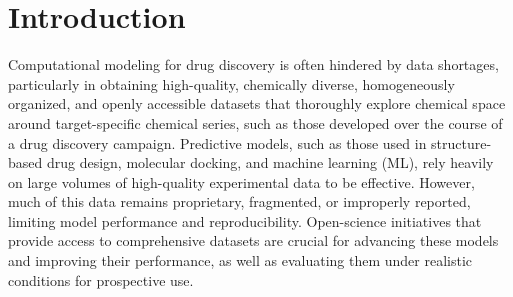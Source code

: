 \documentclass[journal=jcim,manuscript=article]{achemso}
\begin{document}
\section{Introduction}
Computational modeling for drug discovery is often hindered by data shortages, particularly in obtaining high-quality, chemically diverse, homogeneously organized, and openly accessible datasets that 
thoroughly explore chemical space around target-specific chemical series, such as those developed over the course of a drug discovery campaign\cite{van_tilborg_deep_2024, volkamer_machine_2023}.  Predictive models, such as those used in structure-based drug design, molecular docking, and machine learning (ML), rely heavily on  large volumes of high-quality experimental data to be effective. However, much of this data remains proprietary, fragmented, or improperly reported, limiting model performance and reproducibility.\cite{baker_1500_2016, ash_practically_2024, kapoor_leakage_2023, wognum_call_2024, volkamer_machine_2023} Open-science initiatives that provide access to comprehensive datasets are crucial for advancing these models and improving their performance, as well as evaluating them under realistic conditions for prospective use.
\end{document}
